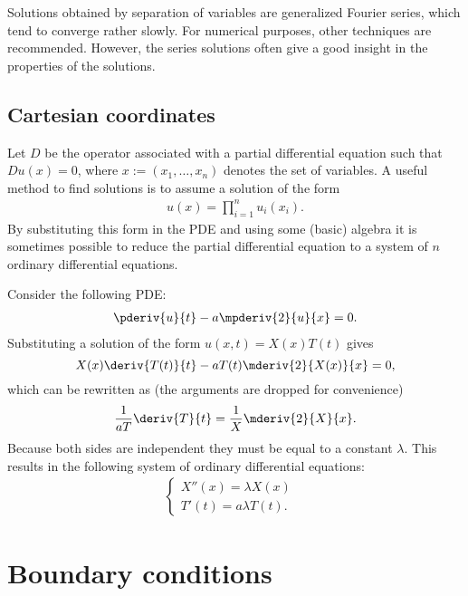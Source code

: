     \begin{remark*}
        Solutions obtained by separation of variables are generalized Fourier series, which tend to converge rather slowly. For numerical purposes, other techniques are recommended. However, the series solutions often give a good insight in the properties of the solutions.
    \end{remark*}

\subsection{Cartesian coordinates}

    \begin{method}
        Let $D$ be the operator associated with a partial differential equation such that $Du(x)=0$, where $x:=(x_1,\ldots,x_n)$ denotes the set of variables. A useful method to find solutions is to assume a solution of the form
        \begin{gather}
            u(x) = \prod_{i=1}^nu_i(x_i).
        \end{gather}
        By substituting this form in the PDE and using some (basic) algebra it is sometimes possible to reduce the partial differential equation to a system of $n$ ordinary differential equations.
    \end{method}

    \begin{example}
        Consider the following PDE:
        \begin{gather}
            \pderiv{u}{t} - a\mpderiv{2}{u}{x} = 0.
        \end{gather}
        Substituting a solution of the form $u(x,t) = X(x)T(t)$ gives \[X(x)\deriv{T(t)}{t} - aT(t)\mderiv{2}{X(x)}{x} = 0,\] which can be rewritten as (the arguments are dropped for convenience) \[\frac{1}{aT}\deriv{T}{t} = \frac{1}{X}\mderiv{2}{X}{x}.\] Because both sides are independent they must be equal to a constant $\lambda$. This results in the following system of ordinary differential equations:
        \begin{gather}
            \begin{cases}
                X''(x) = \lambda X(x)&\\
                T'(t) = a\lambda T(t).&
            \end{cases}
        \end{gather}
    \end{example}

\section{Boundary conditions}

